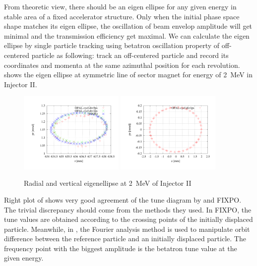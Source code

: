 From theoretic view, there should be an eigen ellipse for any given energy in stable area of a fixed accelerator structure. Only when the initial phase space
shape matches its eigen ellipse, the oscillation of beam envelop amplitude will get minimal and the transmission efficiency get maximal.
We can calculate the eigen ellipse by single particle tracking using betatron oscillation property of off-centered particle as following: track
an off-centered particle and record its coordinates and momenta at the same azimuthal position for each revolution.
 shows the eigen ellipse at symmetric line of sector magnet for energy of \SI{2}{\mega\electronvolt} in Injector II.

\begin{figure}[tb]
\centering
   \includegraphics[width=0.45\textwidth]{figures/cyclotron/RadialEigen_Inj2}
   \includegraphics[width=0.45\textwidth]{figures/cyclotron/VertEigen_Inj2}
   \caption{Radial and vertical eigenellipse at \SI{2}{\mega\electronvolt} of Injector II}
   \label{fig:eigen}
\end{figure}


Right plot of  shows very good agreement of the tune diagram by \opalcycl and FIXPO.
The trivial discrepancy should come from the methods they used.
In FIXPO, the tune values are obtained according to the crossing points of the initially displaced particle. Meanwhile, in \opalcycl, the Fourier
analysis method is used to manipulate orbit difference between the reference particle and an initially displaced particle.
The frequency point with the biggest amplitude is the betatron tune value at the given energy.

